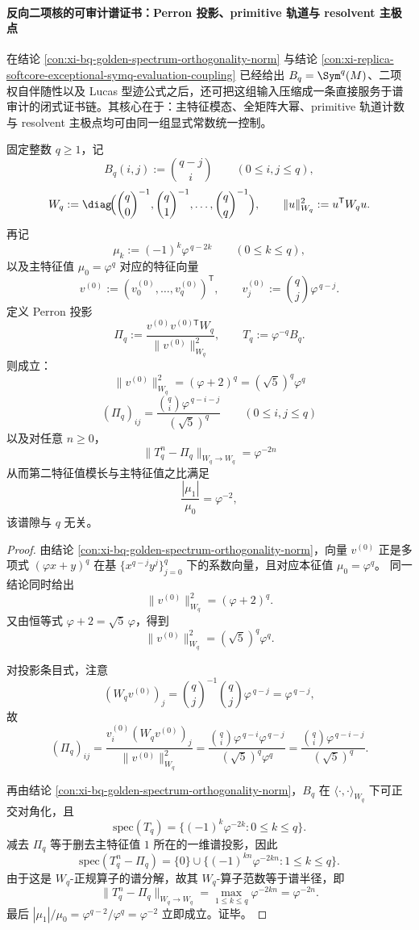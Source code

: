 \paragraph{反向二项核的可审计谱证书：Perron 投影、primitive 轨道与 resolvent 主极点}
在结论 \ref{con:xi-bq-golden-spectrum-orthogonality-norm} 与结论 \ref{con:xi-replica-softcore-exceptional-symq-evaluation-coupling} 已经给出
\(B_q=\Sym^q(M)\)、二项权自伴随性以及 Lucas 型迹公式之后，还可把这组输入压缩成一条直接服务于谱审计的闭式证书链。其核心在于：主特征模态、全矩阵大幂、primitive 轨道计数与 resolvent 主极点均可由同一组显式常数统一控制。

\begin{theorem}\label{thm:xi-bq-auditable-perron-projector-gap}
固定整数 \(q\ge 1\)，记
\[
B_q(i,j):=\binom{q-j}{i}\qquad(0\le i,j\le q),
\]
\[
W_q:=\diag\!\Bigl(\binom{q}{0}^{-1},\binom{q}{1}^{-1},\dots,\binom{q}{q}^{-1}\Bigr),
\qquad
\|u\|_{W_q}^2:=u^{\mathsf T}W_qu.
\]
再记
\[
\mu_k:=(-1)^k\varphi^{\,q-2k}\qquad(0\le k\le q),
\]
以及主特征值 \(\mu_0=\varphi^q\) 对应的特征向量
\[
v^{(0)}:=(v^{(0)}_0,\dots,v^{(0)}_q)^{\mathsf T},
\qquad
v^{(0)}_j:=\binom{q}{j}\varphi^{\,q-j}.
\]
定义 Perron 投影
\[
\Pi_q:=\frac{v^{(0)}v^{(0)\mathsf T}W_q}{\|v^{(0)}\|_{W_q}^2},
\qquad
T_q:=\varphi^{-q}B_q.
\]
则成立：
\[
\boxed{\;
\|v^{(0)}\|_{W_q}^2=(\varphi+2)^q=(\sqrt5)^q\varphi^q\;}
\]
\[
\boxed{\;
(\Pi_q)_{ij}
=
\frac{\binom{q}{i}\varphi^{\,q-i-j}}{(\sqrt5)^q}
\qquad(0\le i,j\le q)\;}
\]
以及对任意 \(n\ge 0\)，
\[
\boxed{\;
\|T_q^n-\Pi_q\|_{W_q\to W_q}=\varphi^{-2n}\;}
\]
从而第二特征值模长与主特征值之比满足
\[
\boxed{\;
\frac{|\mu_1|}{\mu_0}=\varphi^{-2},\;}
\]
该谱隙与 \(q\) 无关。
\end{theorem}
\begin{proof}
由结论 \ref{con:xi-bq-golden-spectrum-orthogonality-norm}，向量 \(v^{(0)}\) 正是多项式
\((\varphi x+y)^q\) 在基 \(\{x^{q-j}y^j\}_{j=0}^{q}\) 下的系数向量，且对应本征值 \(\mu_0=\varphi^q\)。
同一结论同时给出
\[
\|v^{(0)}\|_{W_q}^2=(\varphi+2)^q.
\]
又由恒等式 \(\varphi+2=\sqrt5\,\varphi\)，得到
\[
\|v^{(0)}\|_{W_q}^2=(\sqrt5)^q\varphi^q.
\]

对投影条目式，注意
\[
(W_qv^{(0)})_j=\binom{q}{j}^{-1}\binom{q}{j}\varphi^{\,q-j}=\varphi^{\,q-j},
\]
故
\[
(\Pi_q)_{ij}
=
\frac{v_i^{(0)}(W_qv^{(0)})_j}{\|v^{(0)}\|_{W_q}^2}
=
\frac{\binom{q}{i}\varphi^{\,q-i}\varphi^{\,q-j}}{(\sqrt5)^q\varphi^q}
=
\frac{\binom{q}{i}\varphi^{\,q-i-j}}{(\sqrt5)^q}.
\]

再由结论 \ref{con:xi-bq-golden-spectrum-orthogonality-norm}，\(B_q\) 在 \(\langle\cdot,\cdot\rangle_{W_q}\) 下可正交对角化，且
\[
\mathrm{spec}(T_q)=\{(-1)^k\varphi^{-2k}:0\le k\le q\}.
\]
减去 \(\Pi_q\) 等于删去主特征值 \(1\) 所在的一维谱投影，因此
\[
\mathrm{spec}(T_q^n-\Pi_q)=\{0\}\cup\{(-1)^{kn}\varphi^{-2kn}:1\le k\le q\}.
\]
由于这是 \(W_q\)-正规算子的谱分解，故其 \(W_q\)-算子范数等于谱半径，即
\[
\|T_q^n-\Pi_q\|_{W_q\to W_q}
=
\max_{1\le k\le q}\varphi^{-2kn}
=
\varphi^{-2n}.
\]
最后
\(
|\mu_1|/\mu_0=\varphi^{q-2}/\varphi^q=\varphi^{-2}
\)
立即成立。证毕。
\end{proof}


